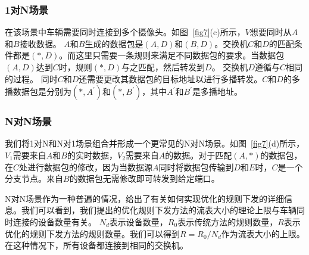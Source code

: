 \documentclass{ctexart}
\begin{document}
\subsubsection{1对N场景} \label{1 to N}

在该场景中车辆需要同时连接到多个摄像头。如图~\ref{fig7}(c)所示，$V$想要同时从$A$和$B$接收数据。 $A$和$B$生成的数据包是$(A, D)$和$(B, D)$。交换机$C$和$D$的匹配条件都是$(*, D)$。而这里只需要一条规则来满足不同数据包的要求。当数据包$(A, D)$达到$C$时，规则$(*,D)$与之匹配，然后转发到$D$。 交换机$D$遵循与$C$相同的过程。 同时$C$和$D$还需要更改其数据包的目标地址以进行多播转发。$C$和$D$的多播数据包是分别为$(*,A^{'})$和$(*,B^{'})$，其中$A^{'}$和$B^{'}$是多播地址。




\subsubsection{N对N场景} \label{N to N}

我们将1对N和N对1场景组合并形成一个更常见的N对N场景。如图~\ref{fig7}(d)所示，$V_{1}$需要来自$A$和$B$的实时数据，$V_{2}$需要来自$A$的数据。对于匹配$(A, *)$的数据包，在$C$处进行数据包的修改，因为当数据源$A$同时将数据包传输到$D$和$E$时，$C$是一个分支节点。来自$B$的数据包无需修改即可转发到给定端口。

%

N对N场景作为一种普遍的情况，给出了有关如何实现优化的规则下发的详细信息。我们可以看到，我们提出的优化规则下发方法的流表大小的理论上限与车辆同时连接的设备数量有关。 $N_{d}$表示设备数量，$R_{0}$表示传统方法的规则数量，$R$表示优化的规则下发方法的规则数量。我们可以得到$R = R_{0}/N_{d}$作为流表大小的上限。在这种情况下，所有设备都连接到相同的交换机。
\end{document}
